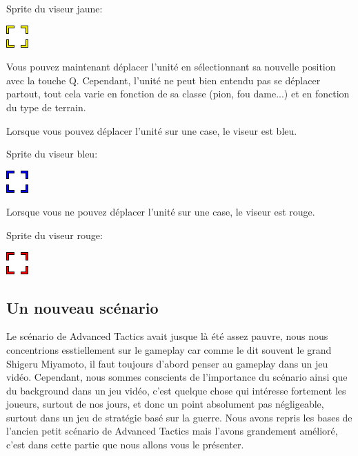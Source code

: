 \documentclass{article}
\begin{document}
\par
Sprite du viseur jaune:
\newline

\includegraphics[scale=1]{jaune}

\newline

\par
Vous pouvez maintenant déplacer l'unité en sélectionnant sa nouvelle position avec la touche Q. Cependant, l'unité ne peut bien entendu pas se déplacer partout, tout cela varie en fonction de sa classe (pion, fou dame...) et en fonction du type de terrain.
\newline

\par
Lorsque vous pouvez déplacer l'unité sur une case, le viseur est bleu.
\newline

\par
Sprite du viseur bleu:
\newline

\includegraphics[scale=1]{bleu}

\newline

\par
Lorsque vous ne pouvez déplacer l'unité sur une case, le viseur est rouge.
\newline

\par
Sprite du viseur rouge:
\newline

\includegraphics[scale=1]{rouge}

\newpage

\subsection{Un nouveau scénario}

\par
Le scénario de Advanced Tactics avait jusque là été assez pauvre, nous nous concentrions esstiellement sur le gameplay car comme le dit souvent le grand Shigeru Miyamoto, il faut toujours d'abord penser au gameplay dans un jeu vidéo. Cependant, nous sommes conscients de l'importance du scénario ainsi
que du background dans un jeu vidéo, c'est quelque chose qui intéresse fortement les joueurs, surtout de nos jours, et donc un point absolument pas négligeable, surtout dans un jeu de stratégie basé sur la guerre. Nous avons repris les bases de l'ancien petit scénario de Advanced Tactics mais l'avons grandement
amélioré, c'est dans cette partie que nous allons vous le présenter.
\newline
\end{document}
